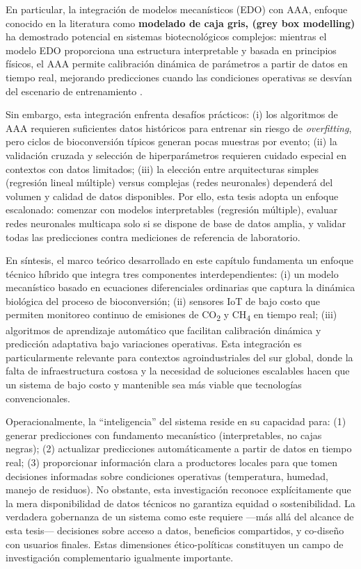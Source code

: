 En particular, la integración de modelos mecanísticos (EDO) con AAA, enfoque conocido en la literatura como \textbf{modelado de caja gris, (grey box modelling)} ha demostrado 
potencial en sistemas biotecnológicos complejos: mientras el modelo EDO proporciona 
una estructura interpretable y basada en principios físicos, el AAA permite calibración 
dinámica de parámetros a partir de datos en tiempo real, mejorando predicciones cuando 
las condiciones operativas se desvían del escenario de entrenamiento 
\parencite{kobelskiProcessOptimizationBlack2024,guillaumeAsymptoticEstimatedDigestibility2023}. 

Sin embargo, esta integración enfrenta desafíos prácticos: (i) los algoritmos de AAA 
requieren suficientes datos históricos para entrenar sin riesgo de \textit{overfitting}, 
pero ciclos de bioconversión típicos generan pocas muestras por evento; (ii) la validación 
cruzada y selección de hiperparámetros requieren cuidado especial en contextos con datos 
limitados; (iii) la elección entre arquitecturas simples (regresión lineal múltiple) versus 
complejas (redes neuronales) dependerá del volumen y calidad de datos disponibles. Por ello, 
esta tesis adopta un enfoque escalonado: comenzar con modelos interpretables (regresión múltiple), 
evaluar redes neuronales multicapa solo si se dispone de base de datos amplia, y validar todas 
las predicciones contra mediciones de referencia de laboratorio.

En síntesis, el marco teórico desarrollado en este capítulo fundamenta un enfoque 
técnico híbrido que integra tres componentes interdependientes: (i) un modelo mecanístico 
basado en ecuaciones diferenciales ordinarias que captura la dinámica biológica del proceso 
de bioconversión; (ii) sensores IoT de bajo costo que permiten monitoreo continuo de emisiones 
de CO\textsubscript{2} y CH\textsubscript{4} en tiempo real; (iii) algoritmos de aprendizaje 
automático que facilitan calibración dinámica y predicción adaptativa bajo variaciones 
operativas. Esta integración es particularmente relevante para contextos agroindustriales 
del sur global, donde la falta de infraestructura costosa y la necesidad de soluciones 
escalables hacen que un sistema de bajo costo y mantenible sea más viable que tecnologías 
convencionales.

Operacionalmente, la ``inteligencia'' del sistema reside en su capacidad para: (1) generar 
predicciones con fundamento mecanístico (interpretables, no cajas negras); (2) actualizar 
predicciones automáticamente a partir de datos en tiempo real; (3) proporcionar información 
clara a productores locales para que tomen decisiones informadas sobre condiciones operativas 
(temperatura, humedad, manejo de residuos). No obstante, esta investigación reconoce 
explícitamente que la mera disponibilidad de datos técnicos no garantiza equidad o sostenibilidad. 
La verdadera gobernanza de un sistema como este requiere —más allá del alcance de esta tesis— 
decisiones sobre acceso a datos, beneficios compartidos, y co-diseño con usuarios finales. 
Estas dimensiones ético-políticas constituyen un campo de investigación complementario 
igualmente importante.

